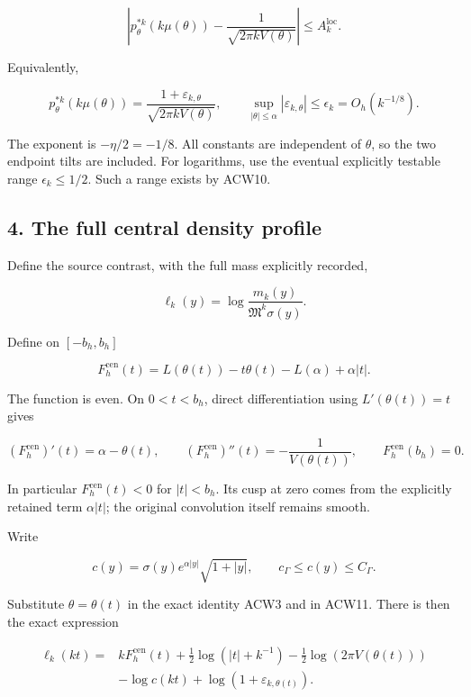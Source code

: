 \documentclass[11pt,a4paper]{article}
\begin{document}
\[
\left|
p_\theta^{*k}(k\mu(\theta))
-\frac1{\sqrt{2\pi kV(\theta)}}
\right|\le A_k^{\mathrm{loc}}.
\]

Equivalently,

\[
\boxed{
p_\theta^{*k}(k\mu(\theta))
=\frac{1+\varepsilon_{k,\theta}}
{\sqrt{2\pi kV(\theta)}},
\qquad
\sup_{|\theta|\le\alpha}|\varepsilon_{k,\theta}|\le\epsilon_k
=O_h(k^{-1/8}).}
\tag{ACW11}
\]

The exponent is \(-\eta/2=-1/8\). All constants are independent of \(\theta\), so the two endpoint tilts are included. For logarithms, use the eventual explicitly testable range \(\epsilon_k\le1/2\). Such a range exists by ACW10.

\subsection{4. The full central density profile}\label{acw:the-full-central-density-profile}

Define the source contrast, with the full mass explicitly recorded,

\[
\ell_k(y)=\log\frac{m_k(y)}{\mathfrak M^k\sigma(y)}.
\]

Define on \([-b_h,b_h]\)

\[
F_h^{\mathrm{cen}}(t)=
L(\theta(t))-t\theta(t)-L(\alpha)+\alpha|t|.
\tag{ACW12}
\]

The function is even. On \(0<t<b_h\), direct differentiation using \(L'(\theta(t))=t\) gives

\[
(F_h^{\mathrm{cen}})'(t)=\alpha-\theta(t),
\qquad
(F_h^{\mathrm{cen}})''(t)=-\frac1{V(\theta(t))},
\qquad F_h^{\mathrm{cen}}(b_h)=0.
\]

In particular \(F_h^{\mathrm{cen}}(t)<0\) for \(|t|<b_h\). Its cusp at zero comes from the explicitly retained term \(\alpha|t|\); the original convolution itself remains smooth.

Write

\[
c(y)=\sigma(y)e^{\alpha|y|}\sqrt{1+|y|},
\qquad c_\Gamma\le c(y)\le C_\Gamma.
\]

Substitute \(\theta=\theta(t)\) in the exact identity ACW3 and in ACW11. There is then the exact expression

\[
\boxed{
\begin{aligned}
\ell_k(kt)={}&kF_h^{\mathrm{cen}}(t)
+\tfrac12\log(|t|+k^{-1})
-\tfrac12\log(2\pi V(\theta(t)))\\
&-\log c(kt)+\log(1+\varepsilon_{k,\theta(t)}).
\end{aligned}}
\tag{ACW13}
\]
\end{document}
